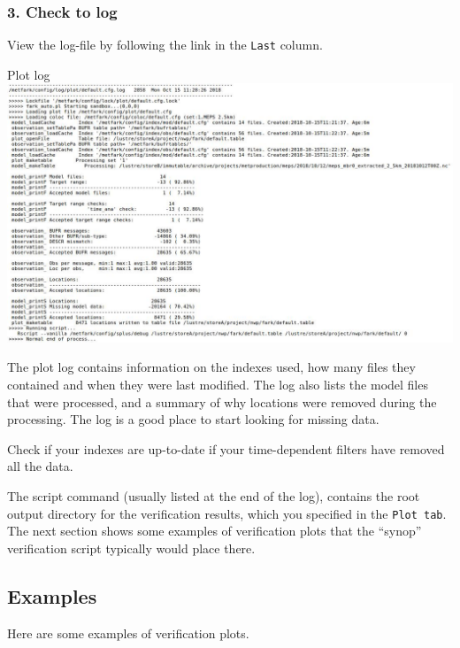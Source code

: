 \documentclass[letterpaper,10pt,twoside,twocolumn,openany]{book}
\begin{document}
{\subsubsection{3. Check to log}
View the log-file by following the link in the \lstinline!Last! column. 
\begin{paperbox}{Plot log}
  \includegraphics[width=\columnwidth]{plotlog.jpg}
\end{paperbox}
The plot log contains information on the indexes used, how many files they contained and when they were last modified.
The log also lists the model files that were processed, and a summary of why locations were removed during the processing. 
The log is a good place to start looking for missing data.
\begin{quotebox}
  Check if your indexes are up-to-date if your time-dependent filters have removed all the data.
\end{quotebox}

The script command (usually listed at the end of the log), contains the root output directory for the verification results, which you specified in the \lstinline!Plot tab!. The next section shows some examples of verification plots that the ``synop'' verification script typically would place there.

\newpage
\subsection{Examples}
Here are some examples of verification plots.

}
\end{document}
